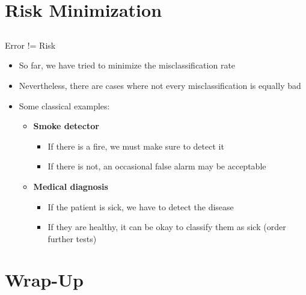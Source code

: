 \section{Risk Minimization}

\subsection{}

\begin{frame}{Error != Risk}{}
	\begin{itemize}
		\item So far, we have tried to minimize the misclassification rate
		\item Nevertheless, there are cases where not every misclassification is equally bad
		\item Some classical examples:
		\begin{itemize}
			\item \textbf{Smoke detector}
			\begin{itemize}
				\item If there is a fire, we must make sure to detect it
				\item If there is not, an occasional false alarm may be acceptable
			\end{itemize}
			\item \textbf{Medical diagnosis}
			\begin{itemize}
				\item If the patient is sick, we have to detect the disease
				\item If they are healthy, it can be okay to classify them as sick (order further tests)
			\end{itemize}
		\end{itemize}
	\end{itemize}
\end{frame}


\section{Wrap-Up}

